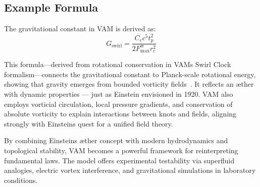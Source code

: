    \subsection*{Example Formula}

    The gravitational constant in VAM is derived as:
    \begin{equation}
        G_\text{swirl} = \frac{C_e c^5 t_p^2}{2 F^{\text{\ae}}_{\text{max}} r_c^2}
    \end{equation}

        This formula—derived from rotational conservation in VAM\rqs s Swirl Clock formalism—connects the gravitational constant to Planck-scale rotational energy, showing that gravity emerges from bounded vorticity fields~\cite{iskandarani2024vam2}. It reflects an æther with dynamic properties — just as Einstein envisioned in 1920. VAM also employs vorticial circulation, local pressure gradients, and conservation of absolute vorticity to explain interactions between knots and fields, aligning strongly with Einstein\rqs s quest for a unified field theory.

    By combining Einstein\rqs s æther concept with modern hydrodynamics and topological stability, VAM becomes a powerful framework for reinterpreting fundamental laws. The model offers experimental testability via superfluid analogies, electric vortex interference, and gravitational simulations in laboratory conditions.
